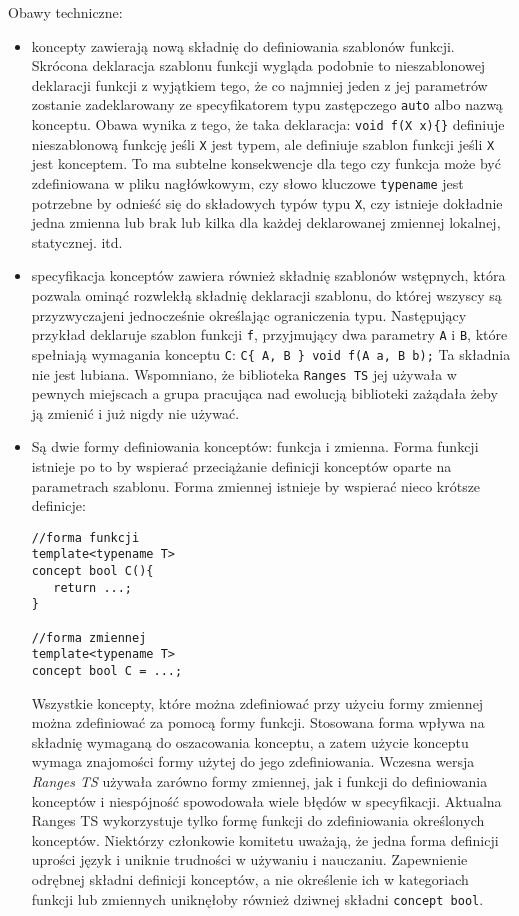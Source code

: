 \documentclass[11pt, a4paper]{article}
\begin{document}
Obawy techniczne:
\begin{itemize}

\item koncepty zawierają nową składnię do definiowania szablonów funkcji. Skrócona deklaracja szablonu funkcji wygląda podobnie to nieszablonowej deklaracji funkcji z wyjątkiem tego, że co najmniej jeden z jej  parametrów zostanie zadeklarowany ze specyfikatorem typu zastępczego \verb#auto# albo nazwą konceptu. Obawa wynika z tego, że taka deklaracja:\newline
\noindent \verb#void f(X x){}# \newline
definiuje nieszablonową funkcję jeśli \verb#X# jest typem, ale definiuje szablon funkcji jeśli \verb#X# jest konceptem. To ma subtelne konsekwencje dla tego czy funkcja może być zdefiniowana w pliku nagłówkowym, czy słowo kluczowe \verb#typename# jest potrzebne by odnieść się do składowych typów typu \verb#X#, czy istnieje dokładnie jedna zmienna lub brak lub kilka dla każdej deklarowanej zmiennej lokalnej, statycznej. itd.


\item specyfikacja konceptów zawiera również składnię szablonów wstępnych, która pozwala ominąć rozwlekłą składnię deklaracji szablonu, do której wszyscy są przyzwyczajeni jednocześnie określając ograniczenia typu. Następujący przykład deklaruje szablon funkcji \verb#f#, przyjmujący dwa parametry \verb#A# i \verb#B#, które spełniają wymagania konceptu \verb#C#: \newline
\verb#C{ A, B } void f(A a, B b);#\newline
Ta składnia nie jest lubiana. Wspomniano, że biblioteka \verb#Ranges TS# jej używała w pewnych miejscach a grupa pracująca nad ewolucją biblioteki zażądała żeby ją zmienić i już nigdy nie używać.
\item Są dwie formy definiowania konceptów: funkcja i zmienna. Forma funkcji istnieje po to by wspierać przeciążanie definicji konceptów oparte na parametrach szablonu. Forma zmiennej istnieje by wspierać nieco krótsze definicje:

\begin{lstlisting}[frame=single]
//forma funkcji
template<typename T>
concept bool C(){
   return ...;
}

//forma zmiennej
template<typename T>
concept bool C = ...;
\end{lstlisting}

Wszystkie koncepty, które można zdefiniować przy użyciu formy zmiennej można zdefiniować za pomocą formy funkcji. Stosowana forma wpływa na składnię wymaganą do oszacowania konceptu, a zatem użycie konceptu wymaga znajomości formy użytej do jego zdefiniowania. Wczesna wersja \emph{Ranges TS} używała zarówno formy zmiennej, jak i funkcji do definiowania konceptów i niespójność spowodowała wiele błędów w specyfikacji. Aktualna Ranges TS wykorzystuje tylko formę funkcji do zdefiniowania określonych konceptów. Niektórzy członkowie komitetu uważają, że jedna forma definicji uprości język i uniknie trudności w używaniu i nauczaniu. Zapewnienie odrębnej składni definicji konceptów, a nie określenie ich w kategoriach funkcji lub zmiennych uniknęłoby również dziwnej składni \verb#concept bool#.


\end{itemize}
\end{document}
